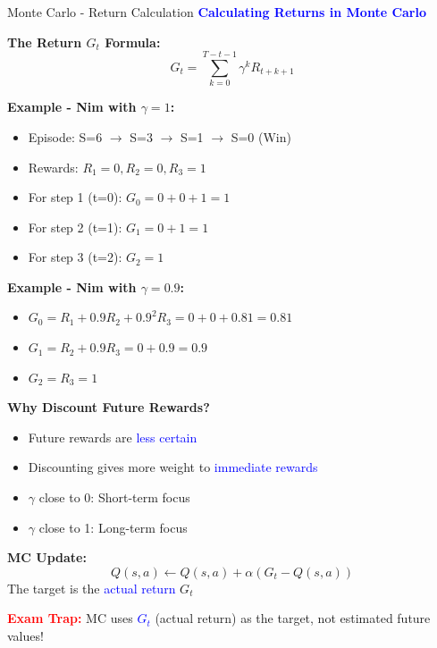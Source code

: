 \documentclass[8pt]{beamer}
\begin{document}
	\begin{frame}{Monte Carlo - Return Calculation}
		\fontsize{6.5}{7.5}\selectfont
		\textcolor{blue}{\textbf{Calculating Returns in Monte Carlo}}
		
		\textbf{The Return $G_t$ Formula:}
		\[
		G_t = \sum_{k=0}^{T-t-1} \gamma^k R_{t+k+1}
		\]
		
		\textbf{Example - Nim with $\gamma = 1$:}
		\begin{itemize}
			\item Episode: S=6 $\rightarrow$ S=3 $\rightarrow$ S=1 $\rightarrow$ S=0 (Win)
			\item Rewards: $R_1=0, R_2=0, R_3=1$
			\item For step 1 (t=0): $G_0 = 0 + 0 + 1 = 1$
			\item For step 2 (t=1): $G_1 = 0 + 1 = 1$
			\item For step 3 (t=2): $G_2 = 1$
		\end{itemize}
		
		\textbf{Example - Nim with $\gamma = 0.9$:}
		\begin{itemize}
			\item $G_0 = R_1 + 0.9R_2 + 0.9^2R_3 = 0 + 0 + 0.81 = 0.81$
			\item $G_1 = R_2 + 0.9R_3 = 0 + 0.9 = 0.9$
			\item $G_2 = R_3 = 1$
		\end{itemize}
		
		\textbf{Why Discount Future Rewards?}
		\begin{itemize}
			\item Future rewards are \textcolor{blue}{less certain}
			\item Discounting gives more weight to \textcolor{blue}{immediate rewards}
			\item $\gamma$ close to 0: Short-term focus
			\item $\gamma$ close to 1: Long-term focus
		\end{itemize}
		
		\textbf{MC Update:}
		\[
		Q(s,a) \leftarrow Q(s,a) + \alpha(G_t - Q(s,a))
		\]
		The target is the \textcolor{blue}{actual return} $G_t$
		
		\textcolor{red}{\textbf{Exam Trap:}} MC uses \textcolor{blue}{$G_t$} (actual return) as the target, not estimated future values!
	\end{frame}
	
\end{document}
